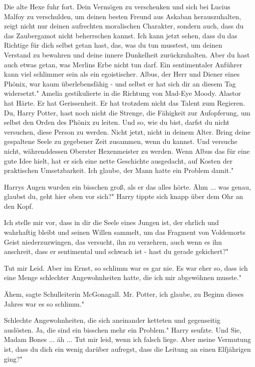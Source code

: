 Die alte Hexe fuhr fort. \glqq Dein Vermögen zu verschenken und sich bei Lucius
Malfoy zu verschulden, um deinen besten Freund aus Askaban herauszuhalten, zeigt
nicht nur deinen aufrechten moralischen Charakter, sondern auch, dass du das
Zaubergamot nicht beherrschen kannst. Ich kann jetzt sehen, dass du das Richtige
für dich selbst getan hast, das, was du tun musstest, um deinen Verstand zu
bewahren und deine innere Dunkelheit zurückzuhalten. Aber du hast auch etwas
getan, was Merlins Erbe nicht tun darf. Ein sentimentaler Anführer kann viel
schlimmer sein als ein egoistischer. Albus, der Herr und Diener eines Phönix,
war kaum überlebensfähig - und selbst er hat sich dir an diesem Tag widersetzt."
Amelia gestikulierte in die Richtung von Mad-Eye Moody. \glqq Alastor hat Härte.
Er hat Gerissenheit. Er hat trotzdem nicht das Talent zum Regieren. Du, Harry
Potter, hast noch nicht die Strenge, die Fähigkeit zur Aufopferung, um selbst
den Orden des Phönix zu leiten. Und so, wie du bist, darfst du nicht versuchen,
diese Person zu werden. Nicht jetzt, nicht in deinem Alter. Bring deine
gespaltene Seele zu gegebener Zeit zusammen, wenn du kannst. Und versuche nicht,
währenddessen Oberster Hexenmeister zu werden. Wenn Albus das für eine gute Idee
hielt, hat er sich eine nette Geschichte ausgedacht, auf Kosten der praktischen
Umsetzbarkeit. Ich glaube, der Mann hatte ein Problem damit."

Harrys Augen wurden ein bisschen groß, als er das alles hörte. \glqq Ähm ... was
genau, glaubst du, geht hier oben vor sich?" Harry tippte sich knapp über dem
Ohr an den Kopf.

\glqq Ich stelle mir vor, dass in dir die Seele eines Jungen ist, der ehrlich
und wahrhaftig bleibt und seinen Willen sammelt, um das Fragment von Voldemorts
Geist niederzuzwingen, das versucht, ihn zu verzehren, auch wenn es ihn
anschreit, dass er sentimental und schwach ist - hast du gerade gekichert?"

\glqq Tut mir Leid. Aber im Ernst, so schlimm war es gar nie. Es war eher so,
dass ich eine Menge schlechter Angewohnheiten hatte, die ich mir abgewöhnen
musste."

\glqq Ähem\grqq{}, sagte Schulleiterin McGonagall. \glqq Mr. Potter, ich glaube,
zu Beginn dieses Jahres war es so schlimm."

\glqq Schlechte Angewohnheiten, die sich aneinander ketteten und gegenseitig
auslösten. Ja, die sind ein bisschen mehr ein Problem." Harry seufzte. \glqq Und
Sie, Madam Bones ... äh ... Tut mir leid, wenn ich falsch liege. Aber meine
Vermutung ist, dass du dich ein wenig darüber aufregst, dass die Leitung an
einen Elfjährigen ging?"

